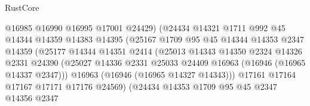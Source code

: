 \begin{lexlean}{RustCore}
\begin{coremodule}
                                    @16985
                                    @16990
                                    @16995
                                    @17001
                                    @24429)
                                  (@24434
                                    @14321
                                    @1711
                                    @992
                                    @45
                                    @14344
                                    @14359
                                    @14383
                                    @14395
                                    (@25167
                                      @1709
                                      @95
                                      @45
                                      @14344
                                      @14353
                                      @2347
                                      @14359
                                      (@25177
                                        @14344
                                        @14351
                                        @2414
                                        (@25013
                                          @14343
                                          @14350
                                          @2324
                                          @14326
                                          @2331
                                          @24390
                                          (@25027
                                            @14336
                                            @2331
                                            @25033
                                            @24409
                                            @16963
                                            (@16946 (@16965 @14337 @2347)))
                                          @16963
                                          (@16946 (@16965 @14327 @14343)))
                                        @17161
                                        @17164
                                        @17167
                                        @17171
                                        @17176
                                        @24569)
                                      (@24434
                                        @14353
                                        @1709
                                        @95
                                        @45
                                        @2347
                                        @14356
                                        @2347

\end{coremodule}
\end{lexlean}

